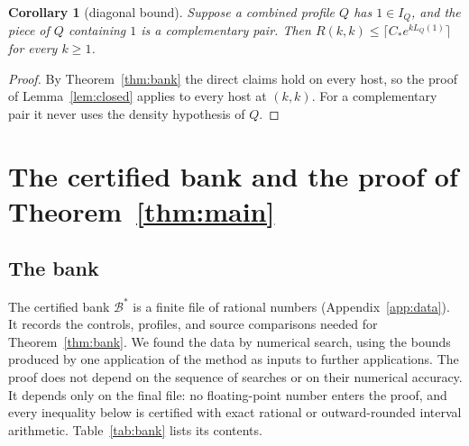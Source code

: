 \documentclass[11pt]{article}
\newtheorem{corollary}[theorem]{Corollary}
\theoremstyle{definition}
\theoremstyle{remark}
\begin{document}
\begin{corollary}[diagonal bound]\label{cor:diag}
Suppose a combined profile $Q$ has $1\in I_Q$, and the piece of $Q$ containing $1$ is a complementary pair. Then
$R(k,k)\le\lceil C_*e^{kL_Q(1)}\rceil$ for every $k\ge1$.
\end{corollary}

\begin{proof}
By Theorem~\ref{thm:bank} the direct claims hold on every host, so the proof of Lemma~\ref{lem:closed} applies to every
host at $(k,k)$. For a complementary pair it never uses the density hypothesis of $Q$.
\end{proof}

\section{The certified bank and the proof of Theorem~\ref{thm:main}}\label{sec:certificate}

\subsection{The bank}

The certified bank $\mathcal B^*$ is a finite file of rational numbers (Appendix~\ref{app:data}).
It records the controls, profiles, and source comparisons needed for Theorem~\ref{thm:bank}.
We found the data by numerical search, using the bounds produced by one application of the method as inputs
to further applications. The proof does not depend on the sequence of searches or on their numerical accuracy.
It depends only on the final file: no floating-point number enters the proof, and every inequality below
is certified with exact rational or outward-rounded interval arithmetic.
Table~\ref{tab:bank} lists its contents.
\end{document}
